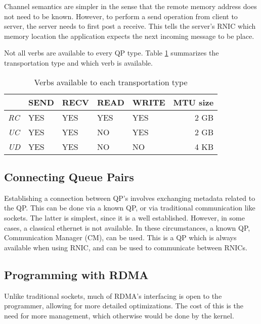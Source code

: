 Channel semantics are simpler in the sense that the remote memory address does not need to be known.
However, to perform a send operation from client to server, the server needs to first post a receive.
This tells the server's RNIC which memory location the application expects the next incoming message to be place.

Not all verbs are available to every QP type. Table \ref{tab:transport-verb} summarizes the transportation type and which verb is available.

\begin{table}
    \centering
    \begin{tabular}{lllllr}
        \toprule
          & \textbf{SEND} & \textbf{RECV} & \textbf{READ} & \textbf{WRITE} & \textbf{MTU size} \\
        \midrule
        \textit{RC} & YES & YES & YES & YES & 2 GB \\
        \textit{UC} & YES & YES & NO & YES & 2 GB \\
        \textit{UD} & YES & YES & NO & NO & 4 KB \\
        \bottomrule
    \end{tabular}
    \caption{Verbs available to each transportation type}
    \label{tab:transport-verb}
\end{table}

\subsection{Connecting Queue Pairs}\label{subsec:connecting-qp's}
Establishing a connection between QP's involves exchanging metadata related to the QP.
This can be done via a known QP, or via traditional communication like sockets.
The latter is simplest, since it is a well established.
However, in some cases, a classical ethernet is not available.
In these circumstances, a known QP, Communication Manager (CM), can be used.
This is a QP which is always available when using RNIC, and can be used to communicate between RNICs.

\subsection{Programming with RDMA}\label{subsec:programming-with-rdma}
Unlike traditional sockets, much of RDMA's interfacing is open to the programmer, allowing for more detailed optimizations.
The cost of this is the need for more management, which otherwise would be done by the kernel.

